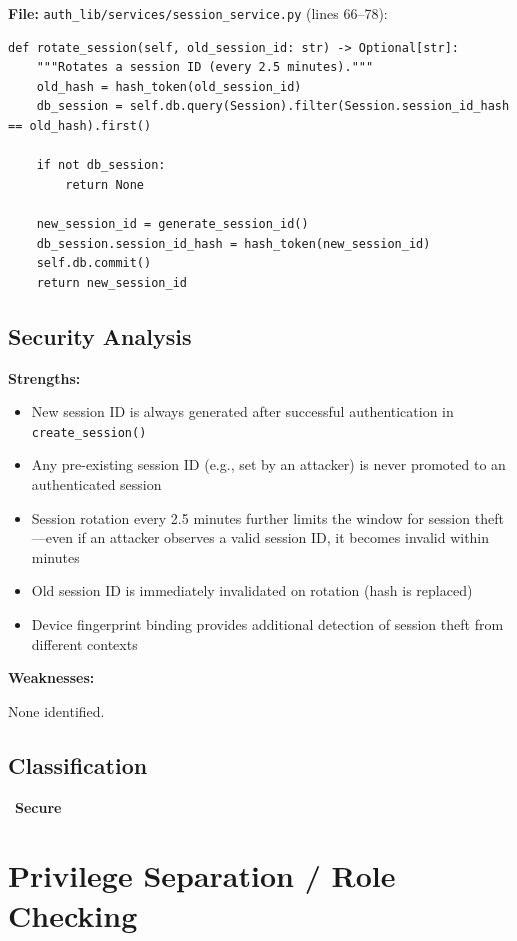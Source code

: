 \documentclass[11pt,a4paper]{article}
\newcommand{\secure}{\textcolor{securegreen}{\checkmark~\textbf{Secure}}}
\begin{document}
\textbf{File:} \texttt{auth\_lib/services/session\_service.py} (lines 66--78):
\begin{lstlisting}
def rotate_session(self, old_session_id: str) -> Optional[str]:
    """Rotates a session ID (every 2.5 minutes)."""
    old_hash = hash_token(old_session_id)
    db_session = self.db.query(Session).filter(Session.session_id_hash == old_hash).first()
    
    if not db_session:
        return None
        
    new_session_id = generate_session_id()
    db_session.session_id_hash = hash_token(new_session_id)
    self.db.commit()
    return new_session_id
\end{lstlisting}

\subsection{Security Analysis}

\textbf{Strengths:}
\begin{itemize}[noitemsep]
    \item New session ID is always generated after successful authentication in \texttt{create\_session()}
    \item Any pre-existing session ID (e.g., set by an attacker) is never promoted to an authenticated session
    \item Session rotation every 2.5 minutes further limits the window for session theft---even if an attacker observes a valid session ID, it becomes invalid within minutes
    \item Old session ID is immediately invalidated on rotation (hash is replaced)
    \item Device fingerprint binding provides additional detection of session theft from different contexts
\end{itemize}

\textbf{Weaknesses:}

None identified.

\subsection{Classification}
\secure

\newpage
\section{Privilege Separation / Role Checking}
\end{document}
